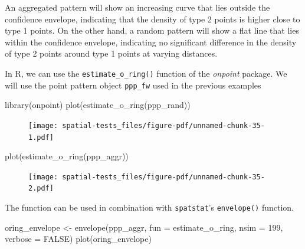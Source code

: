 \documentclass[
  letterpaper,
]{book}
\newenvironment{Shaded}{\begin{snugshade}}{\end{snugshade}}
\newcommand{\AttributeTok}[1]{\textcolor[rgb]{0.40,0.45,0.13}{#1}}
\newcommand{\ConstantTok}[1]{\textcolor[rgb]{0.56,0.35,0.01}{#1}}
\newcommand{\DecValTok}[1]{\textcolor[rgb]{0.68,0.00,0.00}{#1}}
\newcommand{\FunctionTok}[1]{\textcolor[rgb]{0.28,0.35,0.67}{#1}}
\newcommand{\NormalTok}[1]{\textcolor[rgb]{0.00,0.23,0.31}{#1}}
\newcommand{\OtherTok}[1]{\textcolor[rgb]{0.00,0.23,0.31}{#1}}
\begin{document}
An aggregated pattern will show an increasing curve that lies outside
the confidence envelope, indicating that the density of type 2 points is
higher close to type 1 points. On the other hand, a random pattern will
show a flat line that lies within the confidence envelope, indicating no
significant difference in the density of type 2 points around type 1
points at varying distances.

In R, we can use the \texttt{estimate\_o\_ring()} function of the
\emph{onpoint} package. We will use the point pattern object
\texttt{ppp\_fw} used in the previous examples

\begin{Shaded}
\begin{Highlighting}[]
\FunctionTok{library}\NormalTok{(onpoint)}
\FunctionTok{plot}\NormalTok{(}\FunctionTok{estimate\_o\_ring}\NormalTok{(ppp\_rand))}
\end{Highlighting}
\end{Shaded}

\begin{figure}[H]

{\centering \texttt{[image: spatial-tests\_files/figure-pdf/unnamed-chunk-35-1.pdf]}

}

\end{figure}

\begin{Shaded}
\begin{Highlighting}[]
\FunctionTok{plot}\NormalTok{(}\FunctionTok{estimate\_o\_ring}\NormalTok{(ppp\_aggr))}
\end{Highlighting}
\end{Shaded}

\begin{figure}[H]

{\centering \texttt{[image: spatial-tests\_files/figure-pdf/unnamed-chunk-35-2.pdf]}

}

\end{figure}

The function can be used in combination with \texttt{spatstat}'s
\texttt{envelope()} function.

\begin{Shaded}
\begin{Highlighting}[]
\NormalTok{oring\_envelope }\OtherTok{\textless{}{-}} \FunctionTok{envelope}\NormalTok{(ppp\_aggr, }\AttributeTok{fun =}\NormalTok{ estimate\_o\_ring, }\AttributeTok{nsim =} \DecValTok{199}\NormalTok{, }\AttributeTok{verbose =} \ConstantTok{FALSE}\NormalTok{)}
\FunctionTok{plot}\NormalTok{(oring\_envelope)}
\end{Highlighting}
\end{Shaded}
\end{document}
